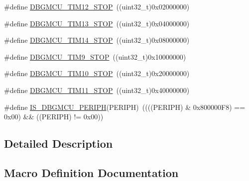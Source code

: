 \begin{DoxyCompactItemize}
\item 
\#define \mbox{\hyperlink{group___d_b_g_m_c_u___exported___constants_ga4814287cef24f57e795b0f5b0174b49c}{D\+B\+G\+M\+C\+U\+\_\+\+T\+I\+M12\+\_\+\+S\+T\+OP}}~((uint32\+\_\+t)0x02000000)
\item 
\#define \mbox{\hyperlink{group___d_b_g_m_c_u___exported___constants_gae0dd8a28977b261b013fa1ecda79b289}{D\+B\+G\+M\+C\+U\+\_\+\+T\+I\+M13\+\_\+\+S\+T\+OP}}~((uint32\+\_\+t)0x04000000)
\item 
\#define \mbox{\hyperlink{group___d_b_g_m_c_u___exported___constants_ga731f63d66045abee68dbc634070df051}{D\+B\+G\+M\+C\+U\+\_\+\+T\+I\+M14\+\_\+\+S\+T\+OP}}~((uint32\+\_\+t)0x08000000)
\item 
\#define \mbox{\hyperlink{group___d_b_g_m_c_u___exported___constants_ga560c557a0d0839dba04f7f2b47851109}{D\+B\+G\+M\+C\+U\+\_\+\+T\+I\+M9\+\_\+\+S\+T\+OP}}~((uint32\+\_\+t)0x10000000)
\item 
\#define \mbox{\hyperlink{group___d_b_g_m_c_u___exported___constants_ga1f0ae2f78e1f9d7eb819bf49b13b5327}{D\+B\+G\+M\+C\+U\+\_\+\+T\+I\+M10\+\_\+\+S\+T\+OP}}~((uint32\+\_\+t)0x20000000)
\item 
\#define \mbox{\hyperlink{group___d_b_g_m_c_u___exported___constants_gade03e5368c3bf8a2f43fc046f1d87f30}{D\+B\+G\+M\+C\+U\+\_\+\+T\+I\+M11\+\_\+\+S\+T\+OP}}~((uint32\+\_\+t)0x40000000)
\item 
\#define \mbox{\hyperlink{group___d_b_g_m_c_u___exported___constants_ga96d44dc7861b6a3f364942704f323a45}{I\+S\+\_\+\+D\+B\+G\+M\+C\+U\+\_\+\+P\+E\+R\+I\+PH}}(P\+E\+R\+I\+PH)~((((P\+E\+R\+I\+PH) \& 0x800000\+F8) == 0x00) \&\& ((\+P\+E\+R\+I\+P\+H) != 0x00))
\end{DoxyCompactItemize}


\subsection{Detailed Description}


\subsection{Macro Definition Documentation}
\mbox{\label{group___d_b_g_m_c_u___exported___constants_ga5ef70e050d1a95f350b6585336a55ca8}} 

